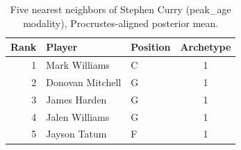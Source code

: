 \begin{table}[htbp]
  \centering\small
  \begin{tabular}{rllc}
    \toprule
    Rank & Player & Position & Archetype \\
    \midrule
    1 & Mark Williams & C & 1 \\
    2 & Donovan Mitchell & G & 1 \\
    3 & James Harden & G & 1 \\
    4 & Jalen Williams & G & 1 \\
    5 & Jayson Tatum & F & 1 \\
    \bottomrule
  \end{tabular}
  \caption{Five nearest neighbors of Stephen Curry (peak_age modality), Procrustes-aligned posterior mean.}
  \label{tab:Stephen_Curry_neighbors_peak_age}
\end{table}

